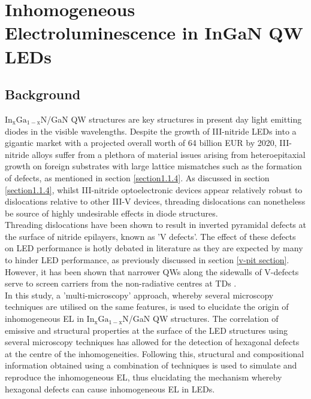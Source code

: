 
\chapter{Inhomogeneous Electroluminescence in InGaN QW LEDs}

\ifpdf
    \graphicspath{{Chapter2/Figs/Raster/}{Chapter2/Figs/PDF/}{Chapter2/Figs/}}
\else
    \graphicspath{{Chapter2/Figs/Vector/}{Chapter2/Figs/}}
\fi


\section[Short title]{Background}


$\mathrm{In_{x}Ga_{1-x}N}$/GaN QW structures are key structures in present day light emitting diodes in the visible wavelengths. Despite the growth of III-nitride LEDs into a gigantic market with a projected overall worth of 64 billion EUR by 2020, III-nitride alloys suffer from a plethora of material issues arising from heteroepitaxial growth on foreign substrates with large lattice mismatches \cite{Bennett2010b} such as the formation of defects, as mentioned in section \ref{section1.1.4}. As discussed in section \ref{section1.1.4}, whilst III-nitride optoelectronic devices appear relatively robust to dislocations relative to other III-V devices, threading dislocations can nonetheless be source of highly undesirable effects in diode structures.\\
Threading dislocations have been shown to result in inverted pyramidal defects at the surface of nitride epilayers, known as 'V defects'. The effect of these defects on LED performance is hotly debated in literature as they are expected by many to hinder LED performance, as previously discussed in section \ref{v-pit section}. However, it has been shown that narrower QWs along the sidewalls of V-defects serve to screen carriers from the non-radiative centres at TDs \cite{Hangleiter2005}.\\
In this study, a 'multi-microscopy' approach, whereby several microscopy techniques are utilised on the same features, is used to elucidate the origin of inhomogeneous EL in $\mathrm{In_{x}Ga_{1-x}N}$/GaN QW structures. The correlation of emissive and structural properties at the surface of the LED structures using several microscopy techniques has allowed for the detection of hexagonal defects at the centre of the inhomogeneities. Following this, structural and compositional information obtained using a combination of techniques is used to simulate and reproduce the inhomogeneous EL, thus elucidating the mechanism whereby hexagonal defects can cause inhomogeneous EL in LEDs.


